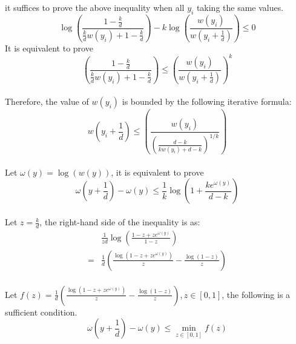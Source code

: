 \documentclass{article}
\begin{document}
it suffices to prove the above inequality when all $y_i$ taking the same values.
\begin{equation*}
\log \left(\frac{1-\frac{k}{d}}{ \frac{k}{d} w\left(y_{i}\right)+1-\frac{k}{d}}\right)
-
k\log \left(\frac{w\left(y_{i}\right)}{w\left(y_{i}+\frac{1}{d}\right)}\right)
\leq 
0
\end{equation*}
It is equivalent to prove 
\begin{equation*}
    \left(\frac{1 - \frac{k}{d}}{ \frac{k}{d} w\left(y_{i}\right)+1 - \frac{k}{d}}\right)
    \leq 
    \left(\frac{w\left(y_{i}\right)}{w\left(y_{i}+\frac{1}{d}\right)}\right)^{k}
\end{equation*}
\\
Therefore, the value of $w(y_i)$ is bounded by the following iterative formula:
\begin{equation*}
    w\left(y_{i}+\frac{1}{d}\right)
    \leq 
    \left(\frac{w\left(y_{i}\right)}{ \left(\frac{d- k}{ k w\left(y_{i}\right)+d - k}\right)^{1/k}}\right)
\end{equation*}
\\
Let $\omega(y) = \log(w(y))$, it is equivalent to prove 
\begin{equation*}
    \omega(y+\frac{1}{d}) - \omega(y) \leq  \frac{1}{k}\log(1 +\frac{ke^{\omega(y)}}{d - k} )
\end{equation*}
\\
Let $z = \frac{k}{d}$, the right-hand side of the inequality is as:
\begin{equation*}
\begin{aligned}
&\frac{1}{zd}\log(\frac{1 - z + ze^{\omega(y)}}{1 - z} )
\\ 
=&\frac{1}{d}\left(\frac{\log(1 - z + ze^{\omega(y)})}{z} - \frac{\log(1-z)}{z}
\right)
\end{aligned}
\end{equation*}
\\
Let $f(z ) =\frac{1}{d}\left(\frac{\log(1 - z + ze^{\omega(y)})}{z} - \frac{\log(1-z)}{z}
\right), z\in[0,1] $, the following is a sufficient condition.
\begin{equation*}
     \omega(y+\frac{1}{d}) - \omega(y) \leq  \min_{z\in[0,1]} f(z)
\end{equation*}



\end{document}
